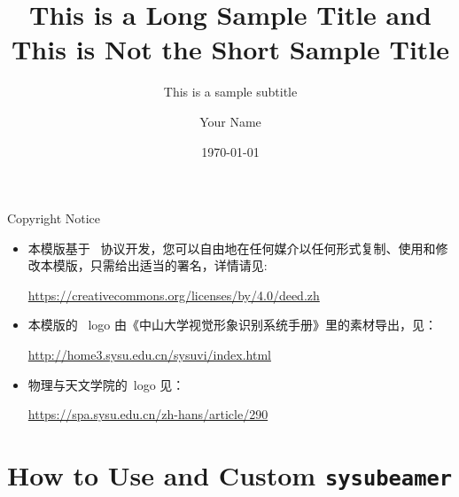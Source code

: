 \documentclass{beamer}
\title[This is a Short Title]{This is a Long Sample Title and This is Not the Short Sample Title}
\subtitle{This is a sample subtitle}
\author{Your Name}
\date{\today}
\begin{document}
\maketitle

\begin{frame}[noframenumbering]{Copyright Notice}
    \begin{CJK*}{UTF8}{gbsn}
    \begin{itemize}
    \item 本模版基于~\href{https://creativecommons.org/licenses/by/4.0/deed.en}{\ccby} 协议开发，您可以自由地在任何媒介以任何形式复制、使用和修改本模版，只需给出适当的署名，详情请见:
    
    \url{https://creativecommons.org/licenses/by/4.0/deed.zh}
    \item 本模版的~ logo 由《中山大学视觉形象识别系统手册》里的素材导出，见：

    \url{http://home3.sysu.edu.cn/sysuvi/index.html}
    \item 物理与天文学院的~logo 见：
    
    \url{https://spa.sysu.edu.cn/zh-hans/article/290}
    \end{itemize}
    \end{CJK*}
\end{frame}

\setcounter{framenumber}{0}

\section{How to Use and Custom \texttt{sysubeamer}}
\end{document}

